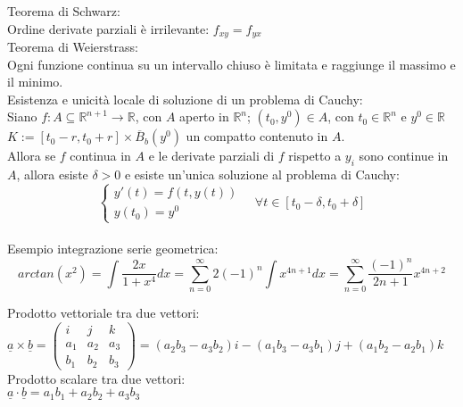 \documentclass[10pt,landscape, a4paper]{article}
\makeatletter
\renewcommand{\section}{\@startsection{section}{1}{0mm}%
                                {-1ex plus -.5ex minus -.2ex}%
                                {0.5ex plus .2ex}%
                                {\normalfont\large\bfseries}}
\makeatother
\begin{document}
\begin{multicols}{3}
{Teorema di Schwarz:\\
Ordine derivate parziali è irrilevante: $f_{xy} = f_{yx}$\\

Teorema di Weierstrass:\\
Ogni funzione continua su un intervallo chiuso è limitata e raggiunge il massimo e il minimo.\\

Esistenza e unicità locale di soluzione di un problema di Cauchy:\\
Siano $f: A \subseteq \mathbb{R}^{n+1}\to \mathbb{R}$, con $A$ aperto in $\mathbb{R}^n$; $(t_0, y^0) \in A$, con $t_0 \in \mathbb{R}^n$ e $y^0 \in \mathbb{R}$
$K := [t_0-r, t_0+r] \times \overline{B}_b(y^0)$ un compatto contenuto in $A$.\\
Allora se $f$ continua in $A$ e le derivate parziali di $f$ rispetto a $y_i$ sono continue in $A$, allora esiste $\delta > 0$ e esiste un'unica soluzione al problema di Cauchy:
\begin{equation*}
	\begin{cases}
		y'(t) = f(t, y(t))\\
		y(t_0) = y^0
	\end{cases} \quad \forall t \in [t_0-\delta, t_0+\delta]
\end{equation*}\\

Esempio integrazione serie geometrica:\\
\begin{equation*}
	arctan(x^2) = \int \frac{2x}{1+x^4} dx = \sum_{n=0}^{\infty} 2(-1)^n \int x^{4n+1} dx = \sum_{n=0}^{\infty} \frac{(-1)^n}{2n+1}x^{4n+2}
\end{equation*}

Prodotto vettoriale tra due vettori:\\
$\underline{a} \times \underline{b} = \begin{pmatrix}
	i & j & k\\
	a_1 & a_2 & a_3\\
	b_1 & b_2 & b_3
\end{pmatrix} = (a_2b_3 - a_3b_2)i - (a_1b_3 - a_3b_1)j + (a_1b_2 - a_2b_1)k$\\
Prodotto scalare tra due vettori:\\
$\underline{a} \cdot \underline{b} = a_1b_1 + a_2b_2 + a_3b_3$\\

}


\end{multicols}
\end{document}
